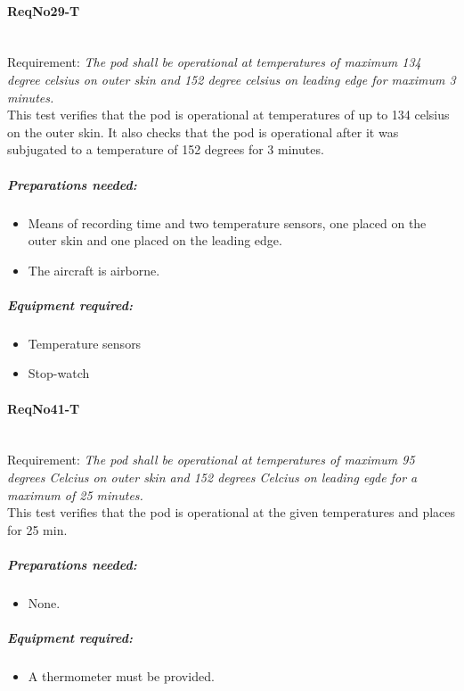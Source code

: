 \paragraph{ReqNo29-T}\mbox{}\\ %
Requirement: \textit{The pod shall be operational at temperatures of maximum 134 degree celsius on outer skin and 152 degree celsius on leading edge for maximum 3 minutes.}
\\
This test verifies that the pod is operational at temperatures of up to 134 celsius on the outer skin. It also checks that the pod is operational after it was subjugated to a temperature of 152 degrees for 3 minutes.
\\
	\subparagraph{Preparations needed:}
	\begin{itemize}
	\item Means of recording time and two temperature sensors, one placed on the outer skin and one placed on the leading edge.
	\item The aircraft is airborne.
	\end{itemize}

	\subparagraph{Equipment required:}
	\begin{itemize}
	\item Temperature sensors
	\item Stop-watch
	\end{itemize} 


\paragraph{ReqNo41-T}\mbox{}\\ %
Requirement: \textit{The pod shall be operational at temperatures of maximum 95 degrees Celcius on outer skin and 152 degrees Celcius on leading egde for a maximum of 25 minutes.}\\
This test verifies that the pod is operational at the given temperatures and places for 25 min.\\

	\subparagraph{Preparations needed:}
	\begin{itemize}
	\item None.
	\end{itemize} 
		
	\subparagraph{Equipment required:}
	\begin{itemize}
	\item  A thermometer must be provided.
	\end{itemize}
	
